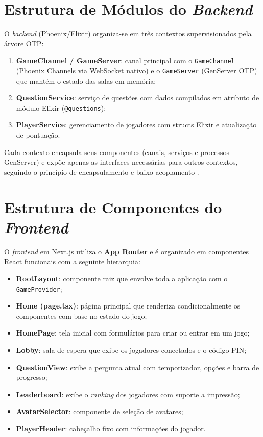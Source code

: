 \documentclass[
	12pt,
	openany,
	oneside,
	a4paper,
	english,
	brazil
]{abntex2}
\begin{document}
\section{Estrutura de Módulos do \textit{Backend}}\label{sec:modulos_backend}

O \textit{backend} (Phoenix/Elixir) organiza-se em três contextos supervisionados pela árvore OTP:

\begin{enumerate}
  \item \textbf{GameChannel / GameServer}: canal principal com o \texttt{GameChannel} (Phoenix Channels via WebSocket nativo) e o \texttt{GameServer} (GenServer OTP) que mantém o estado das salas em memória;
  \item \textbf{QuestionService}: serviço de questões com dados compilados em atributo de módulo Elixir (\texttt{@questions});
  \item \textbf{PlayerService}: gerenciamento de jogadores com structs Elixir e atualização de pontuação.
\end{enumerate}

Cada contexto encapsula seus componentes (canais, serviços e processos GenServer) e expõe apenas as interfaces necessárias para outros contextos, seguindo o princípio de encapsulamento e baixo acoplamento \cite{martin2008, gamma1994}.

\section{Estrutura de Componentes do \textit{Frontend}}

O \textit{frontend} em Next.js utiliza o \textbf{App Router} e é organizado em componentes React funcionais com a seguinte hierarquia:

\begin{itemize}
  \item \textbf{RootLayout}: componente raiz que envolve toda a aplicação com o \texttt{GameProvider};
  \item \textbf{Home (page.tsx)}: página principal que renderiza condicionalmente os componentes com base no estado do jogo;
  \item \textbf{HomePage}: tela inicial com formulários para criar ou entrar em um jogo;
  \item \textbf{Lobby}: sala de espera que exibe os jogadores conectados e o código PIN;
  \item \textbf{QuestionView}: exibe a pergunta atual com temporizador, opções e barra de progresso;
  \item \textbf{Leaderboard}: exibe o \textit{ranking} dos jogadores com suporte a impressão;
  \item \textbf{AvatarSelector}: componente de seleção de avatares;
  \item \textbf{PlayerHeader}: cabeçalho fixo com informações do jogador.
\end{itemize}
\end{document}
